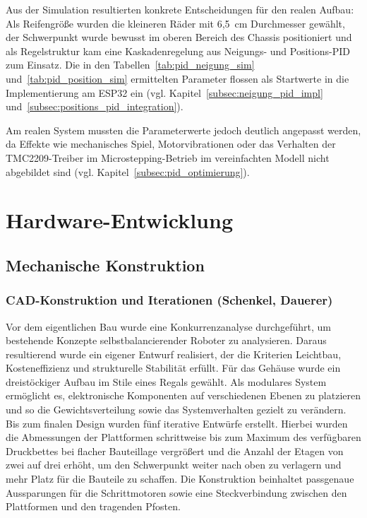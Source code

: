 \documentclass[fontsize=12pt,
parskip=half,	%
department=FakM,  %
logostyle=flat,
twoside, %
DIV=15,BCOR=10mm, %
]{OTHRreprt}
\begin{document}
Aus der Simulation resultierten konkrete Entscheidungen für den realen Aufbau: Als Reifengröße wurden die kleineren Räder mit 6,5~cm Durchmesser gewählt, der Schwerpunkt wurde bewusst im oberen Bereich des Chassis positioniert und als Regelstruktur kam eine Kaskadenregelung aus Neigungs- und Positions-PID zum Einsatz. Die in den Tabellen~\ref{tab:pid_neigung_sim} und~\ref{tab:pid_position_sim} ermittelten Parameter flossen als Startwerte in die Implementierung am ESP32 ein (vgl. Kapitel~\ref{subsec:neigung_pid_impl} und~\ref{subsec:positions_pid_integration}).

Am realen System mussten die Parameterwerte jedoch deutlich angepasst werden, da Effekte wie mechanisches Spiel, Motorvibrationen oder das Verhalten der TMC2209-Treiber im Microstepping-Betrieb im vereinfachten Modell nicht abgebildet sind (vgl. Kapitel~\ref{subsec:pid_optimierung}).

\chapter{Hardware-Entwicklung}
\label{ch:hardware}

\section{Mechanische Konstruktion}
\label{sec:mechanische_konstruktion}

\subsection{CAD-Konstruktion und Iterationen (Schenkel, Dauerer)}
\label{subsec:cad_iterationen}

Vor dem eigentlichen Bau wurde eine Kon\-kur\-renz\-ana\-ly\-se durch\-geführt, um 
bestehende Konzepte selbst\-ba\-lan\-cie\-ren\-der Roboter zu analysieren. Daraus 
resultierend wurde ein eigener Entwurf realisiert, der die Kriterien Leichtbau, 
Kos\-ten\-ef\-fi\-zi\-enz und strukturelle Stabilität erfüllt.
Für das Gehäuse wurde ein dreistöckiger Aufbau im Stile eines Regals gewählt. Als modulares System ermöglicht es, elektronische Komponenten auf verschiedenen Ebenen zu platzieren und so die Gewichtsverteilung sowie das Systemverhalten gezielt zu verändern. Bis zum finalen Design wurden fünf iterative Entwürfe erstellt. Hierbei wurden die Abmessungen der Plattformen schrittweise bis zum Maximum des verfügbaren Druckbettes bei flacher Bauteillage vergrößert und die Anzahl der Etagen von zwei auf drei erhöht, um den Schwerpunkt weiter nach oben zu verlagern und mehr Platz für die Bauteile zu schaffen. Die Konstruktion beinhaltet passgenaue Aussparungen für die Schrittmotoren sowie eine Steckverbindung zwischen den Plattformen und den tragenden Pfosten.
\end{document}
